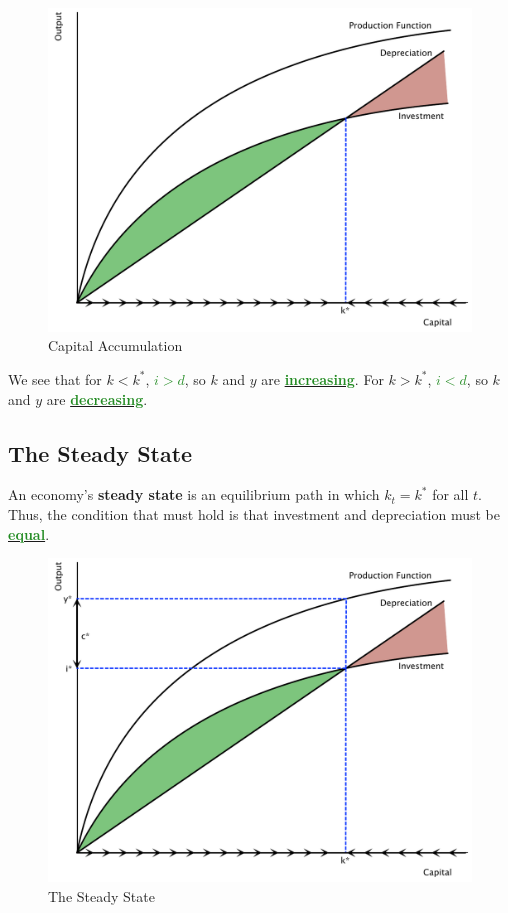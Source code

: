 \documentclass[11pt]{article}\usepackage[]{graphicx}\usepackage[]{color}
\theoremstyle{definition}
\newcommand{\dd}[1]{{\underline{\textbf{\textcolor{ForestGreen}{#1}}}}}
\begin{document}
	\begin{figure}[H]
		\centering
		\includegraphics[scale=.40]{plot84.pdf}
		\caption{Capital Accumulation}
	\end{figure}


We see that for $k<k^*$, \dd{$i>d$}, so $k$ and $y$ are \dd{increasing}. For $k>k^*$, \dd{$i<d$}, so $k$ and $y$ are \dd{decreasing}. 

\subsection{The Steady State}

An economy's \textbf{steady state} is an equilibrium path in which $k_t = k^{*}$ for all $t$. Thus, the condition that must hold is that investment and depreciation must be \dd{equal}.

	\begin{figure}[H]
		\centering
		\includegraphics[scale=.40]{plot85.pdf}
		\caption{The Steady State}
	\end{figure}
\end{document}
